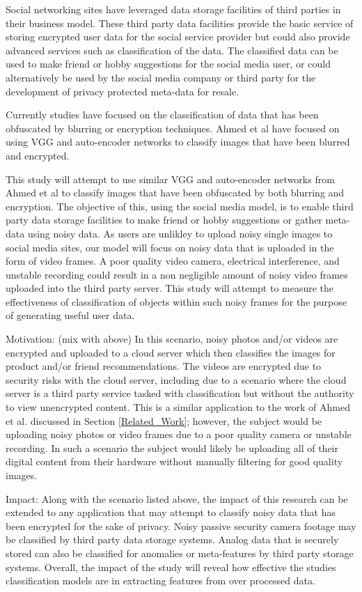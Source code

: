 \documentclass[12pt, titlepage]{article}
\begin{document}
Social networking sites have leveraged data storage facilities of third parties in their business model. These third party data facilities provide the basic service of storing encrypted user data for the social service provider but could also provide advanced services such as classification of the data. 
The classified data can be used to make friend or hobby suggestions for the social media user, or could alternatively be used by the social media company or third party for the development of privacy protected meta-data for resale. 

Currently studies have focused on the classification of data that has been obfuscated by blurring or encryption techniques. Ahmed et al have focused on using VGG and auto-encoder networks to classify images that have been blurred and encrypted. 

This study will attempt to use similar VGG and auto-encoder networks from Ahmed et al to classify images that have been obfuscated by both blurring and encryption. The objective of this, using the social media model, is to enable third party data storage facilities to make friend or hobby suggestions or gather meta-data using noisy data. As users are unlikley to upload noisy single images to social media sites, our model will focus on noisy data that is uploaded in the form of video frames. A poor quality video camera, electrical interference, and unstable recording could result in a non negligible amount of noisy video frames uploaded into the third party server. This study will attempt to measure the effectiveness of classification of objects within such noisy frames for the purpose of generating useful user data. 

Motivation: (mix with above)
In this scenario, noisy photos and/or videos are encrypted and uploaded to a cloud server which then classifies the images for product and/or friend recommendations. The videos are encrypted due to security risks with the cloud server, including due to a scenario where the cloud server is a third party service tasked with classification but without the authority to view unencrypted content. This is a similar application to the work of Ahmed et al. discussed in Section \ref{Related_Work}; however, the subject would be uploading noisy photos or video frames due to a poor quality camera or unstable recording. In such a scenario the subject would likely be uploading all of their digital content from their hardware without manually filtering for good quality images.

Impact: 
Along with the scenario listed above, the impact of this research can be extended to any application that may attempt to classify noisy data that has been encrypted for the sake of privacy. Noisy passive security camera footage may be classified by third party data storage systems. Analog data that is securely stored can also be classified for anomalies or meta-features by third party storage systems. Overall, the impact of the study will reveal how effective the studies classification models are in extracting features from over processed data. 
\end{document}
